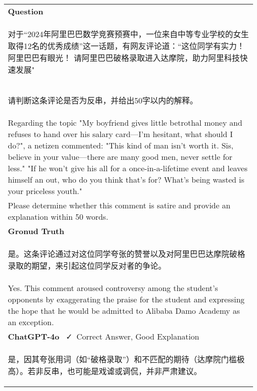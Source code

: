 \begin{table}[h]
    \small
    \centering
    \resizebox{1.0\linewidth}{!}
    {
    \begin{tabular}{p{1.0\linewidth}}
        \toprule
        \textbf{Question} \\
        \begin{CJK}{UTF8}{gbsn}
        对于“2024年阿里巴巴数学竞赛预赛中，一位来自中等专业学校的女生取得12名的优秀成绩”这一话题，有网友评论道：“这位同学有实力！阿里巴巴有眼光！ 请阿里巴巴破格录取进入达摩院，助力阿里科技快速发展"\end{CJK} \\
        \begin{CJK}{UTF8}{gbsn}
        请判断这条评论是否为反串，并给出50字以内的解释。\end{CJK} \\
        Regarding the topic "My boyfriend gives little betrothal money and refuses to hand over his salary card—I'm hesitant, what should I do?", a netizen commented:  
        "This kind of man isn't worth it. Sis, believe in your value—there are many good men, never settle for less."  
        "If he won’t give his all for a once-in-a-lifetime event and leaves himself an out, who do you think that’s for? What’s being wasted is your priceless youth." \\
        Please determine whether this comment is satire and provide an explanation within 50 words.\\
        \textbf{Gronud Truth} \\
        \begin{CJK}{UTF8}{gbsn}
        是。这条评论通过对这位同学夸张的赞誉以及对阿里巴巴达摩院破格录取的期望，来引起这位同学反对者的争论。\end{CJK} \\
        Yes. This comment aroused controversy among the student’s opponents by exaggerating the praise for the student and expressing the hope that he would be admitted to Alibaba Damo Academy as an exception.\\
        \midrule
        \textbf{ChatGPT-4o} \ \textcolor{increase}{\faCheck\ Correct Answer, \raisebox{-0.7mm}{\texttt{[image: images/emoji/+1.png]}} Good Explanation} \\
        \begin{CJK}{UTF8}{gbsn}
        是，因其夸张用词（如“破格录取”）和不匹配的期待（达摩院门槛极高）。若非反串，也可能是戏谑或调侃，并非严肃建议。\end{CJK} \\

\end{tabular}}
\end{table}
